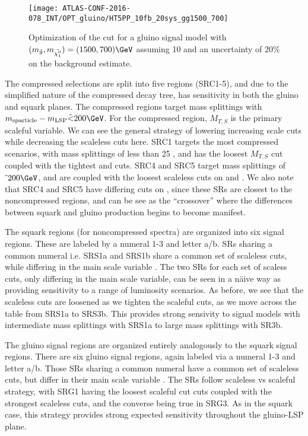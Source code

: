 \begin{figure}
\caption{Optimization of the  cut for a gluino signal model with $(m_{\gluino}, m_{\lsp} ) = (1500,700) \GeV $ assuming 10 \ifb and an uncertainty of 20\% on the background estimate.
} \label{fig:sr_optimization}
\texttt{[image: ATLAS-CONF-2016-078\_INT/OPT\_gluino/HT5PP\_10fb\_20sys\_gg1500\_700]}
\end{figure}

The compressed selections are split into five regions (SRC1-5), and due to the simplified nature of the compressed decay tree, has sensitivity in both the gluino and squark planes.
The compressed regions target mass splittings with $m_{\text{sparticle}} - m_{\text{LSP}} \tilde{<} 200 \GeV$.
For the compressed region, $M_{T, S}$ is the primary scaleful variable.
We can see the general strategy of lowering increasing scale cuts while decreasing the scaleless cuts here.
SRC1 targets the most compressed scenarios, with mass splittings of less than 25 \GeV, and has the loosest $M_{T, S}$ cut coupled with the tightest \risr and \dphiISR cuts.
SRC4 and SRC5 target mass splittings of $\tilde{~} 200 \GeV$, and are coupled with the loosest scaleless cuts on \risr and \dphiISR.
We also note that SRC4 and SRC5 have differing cuts on \NVjet, since these SRs are closest to the noncompressed regions, and can be see as the ``crossover'' where the differences between squark and gluino production begins to become manifest.

The squark regions (for noncompressed spectra) are organized into six signal regions.
These are labeled by a numeral 1-3 and letter a/b.
SRs sharing a common numeral i.e. SRS1a and SRS1b share a common set of scaleless cuts, while differing in the main scale variable .
The two SRs for each set of scaless cuts, only differing in the main scale variable, can be seen in a n{\"a}ive way as providing sensitivity to a range of luminosity scenarios\footnotemark.
As before, we see that the scaleless cuts are loosened as we tighten the scaleful cuts, as we move across the table from SRS1a to SRS3b.
This provides strong sensivity to signal models with intermediate mass splittings with SRS1a to large mass splittings with SR3b.

The gluino signal regions are organized entirely analogously to the squark signal regions.
There are six gluino signal regions, again labeled via a numeral 1-3 and letter a/b.
Those SRs sharing a common numeral have a common set of scaleless cuts, but differ in their main scale variable .
The SRs follow scaleless vs scaleful strategy, with SRG1 having the loosest scaleful cut cuts coupled with the strongest scaleless cuts, and the converse being true in SRG3.
As in the squark case, this strategy provides strong expected sensitivity throughout the gluino-LSP plane.

